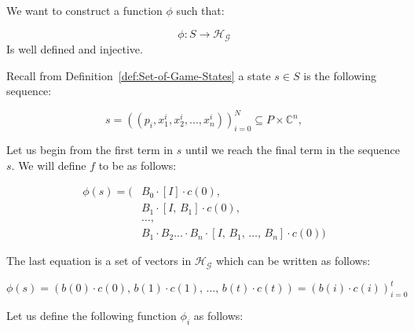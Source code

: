 \documentclass[11pt,a4paper]{article}
\theoremstyle{plain}
\theoremstyle{definition}
\begin{document}
\vspace{0.5em}

We want to construct a function $\phi$ such that:

\vspace{0.5em}

\[
\phi:S\longrightarrow \mathcal{H}_\mathcal{G}
\]
Is well defined and injective.

\vspace{0.5em}

Recall from Definition~\ref{def:Set-of-Game-States} a state $s \in S$ is the following sequence:

\vspace{0.5em}

\[
s = ((p_i,x^i_1,x^i_2,...,x^i_n))_{i=0}^N
\subseteq P\times\mathbb{C}^n,
\]

\vspace{0.5em}

Let us begin from the first term in $s$ until we reach the final term in the sequence $s$. We will define $f$ to be as follows:

\vspace{0.5em}

\begin{equation}
\begin{aligned}
\phi(s) = \Big( & B_0 \cdot [I] \cdot c(0),\, \\
             & B_1 \cdot [I,\, B_1] \cdot c(0),\, \\
             & \ldots, \\
             & B_1 \cdot B_2...\cdot B_n \cdot [I,\, B_1,\, \ldots,\, B_n] \cdot c(0)
\Big)
\end{aligned}
\end{equation}

\vspace{0.5em}

The last equation is a set of vectors in $\mathcal{H}_\mathcal{G}$ which can be written as follows:

\vspace{0.5em}

\begin{equation}
\phi(s) = \left( b(0) \cdot c(0),\, b(1) \cdot c(1),\, \ldots,\, b(t) \cdot c(t) \right)=(b(i) \cdot c(i))_{i=0}^t
\label{eq:ABC-Sequence}
\end{equation}

\vspace{0.5em}

Let us define the following function $\phi_i$ as follows:
\end{document}

